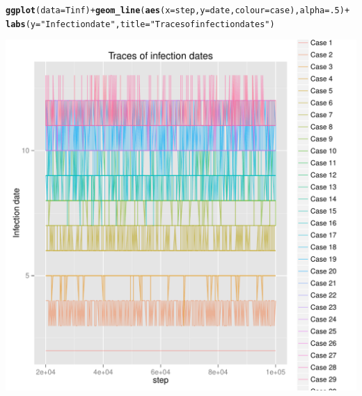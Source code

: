 \documentclass{article}\usepackage[]{graphicx}\usepackage[]{color}
\makeatletter
\newcommand{\hlnum}[1]{\textcolor[rgb]{0.686,0.059,0.569}{#1}}%
\newcommand{\hlstr}[1]{\textcolor[rgb]{0.192,0.494,0.8}{#1}}%
\newcommand{\hlopt}[1]{\textcolor[rgb]{0,0,0}{#1}}%
\newcommand{\hlstd}[1]{\textcolor[rgb]{0.345,0.345,0.345}{#1}}%
\newcommand{\hlkwc}[1]{\textcolor[rgb]{0.333,0.667,0.333}{#1}}%
\newcommand{\hlkwd}[1]{\textcolor[rgb]{0.737,0.353,0.396}{\textbf{#1}}}%
\newenvironment{kframe}{%
 \def\at@end@of@kframe{}%
 \ifinner\ifhmode%
  \def\at@end@of@kframe{\end{minipage}}%
  \begin{minipage}{\columnwidth}%
 \fi\fi%
 \def\FrameCommand##1{\hskip\@totalleftmargin \hskip-\fboxsep
 \colorbox{shadecolor}{##1}\hskip-\fboxsep
     \hskip-\linewidth \hskip-\@totalleftmargin \hskip\columnwidth}%
 \MakeFramed {\advance\hsize-\width
   \@totalleftmargin\z@ \linewidth\hsize
   \@setminipage}}%
 {\par\unskip\endMakeFramed%
 \at@end@of@kframe}
\newenvironment{knitrout}{}{} %
\makeatother
\begin{document}
\begin{knitrout}
\color{fgcolor}\begin{kframe}
\begin{alltt}
\hlkwd{ggplot}\hlstd{(}\hlkwc{data}\hlstd{=Tinf)} \hlopt{+} \hlkwd{geom_line}\hlstd{(}\hlkwd{aes}\hlstd{(}\hlkwc{x}\hlstd{=step,}\hlkwc{y}\hlstd{=date,}\hlkwc{colour}\hlstd{=case),} \hlkwc{alpha}\hlstd{=}\hlnum{.5}\hlstd{)} \hlopt{+}
    \hlkwd{labs}\hlstd{(}\hlkwc{y}\hlstd{=}\hlstr{"Infection date"}\hlstd{,} \hlkwc{title}\hlstd{=}\hlstr{"Traces of infection dates"}\hlstd{)}
\end{alltt}
\end{kframe}

{\centering \includegraphics[width=.6\textwidth]{figs/unnamed-chunk-28} 

}



\end{knitrout}
\end{document}
